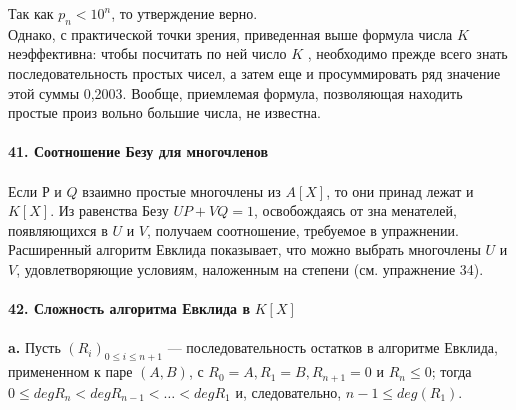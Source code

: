 \documentclass{../../template/mai_book}
\begin{document}
{Так как $p_n < 10^{n}$, то утверждение верно.\\

\hspace*{0pt}Однако, с практической точки зрения, приведенная выше формула\linebreak
числа $K$ неэффективна: чтобы посчитать по ней число $K$ , необходимо\linebreak
прежде всего знать последовательность простых чисел, а затем еще и\linebreak
просуммировать ряд  значение этой суммы 0,2003.\linebreak
Вообще, приемлемая формула, позволяющая находить простые произ­\linebreak
вольно большие числа, не известна.\\
\\
\noindent\textbf{41. Соотношение Безу для многочленов}\\
\\
\hspace*{15pt} Если $Р$ и $Q$ взаимно простые многочлены из $A[X]$, то они принад­\linebreak
лежат и $K[X]$. Из равенства Безу $UP + VQ = 1$, освобождаясь от зна­\linebreak
менателей, появляющихся в $U$ и $V$, получаем соотношение, требуемое в\linebreak
упражнении. Расширенный алгоритм Евклида показывает, что можно\linebreak
выбрать многочлены $U$ и $V$, удовлетворяющие условиям, наложенным\linebreak
на степени (см. упражнение 34).\\
\\
\textbf{42. Сложность алгоритма Евклида в} $\textit{K}[X]$\\
\\
\hspace*{15pt}\textbf{a.} Пусть $(R_i)_{0 \leq i \leq n+1}$ --- последовательность остатков в алгоритме\linebreak
Евклида, примененном к паре $(\textit{A}, \textit{B})$, с  $R_0 = \textit{A}, R_1 = \textit{B}, \textit{R}_{n+1} = 0$ и\linebreak 
$R_n \leq 0$; тогда $0 \leq deg R_n < deg R_{n-1} < \ldots < deg R_1$ и, следовательно,\linebreak
$n - 1 \leq deg(R_1)$.\\
\newpage


}
\end{document}
